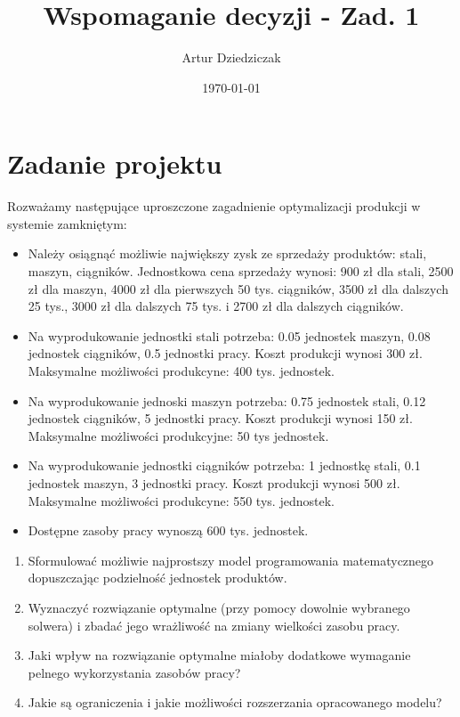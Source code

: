 \documentclass{article}
\title{Wspomaganie decyzji - Zad. 1}
\author{Artur Dziedziczak}
\date{\today}
\begin{document}
\maketitle

\section{Zadanie projektu}

Rozważamy następujące uproszczone zagadnienie optymalizacji produkcji w systemie zamkniętym:
\begin{itemize}
    \item Należy osiągnąć możliwie największy zysk ze sprzedaży produktów: stali, maszyn, ciągników.
          Jednostkowa cena sprzedaży wynosi: 900 zł dla stali, 2500 zł dla maszyn, 4000 zł dla pierwszych 50 tys. ciągników, 3500 zł dla dalszych 25 tys.,
          3000 zł dla dalszych 75 tys. i 2700 zł dla dalszych ciągników.
    \item Na wyprodukowanie jednostki stali potrzeba: 0.05 jednostek maszyn, 0.08 jednostek ciągników, 0.5 jednostki pracy.
          Koszt produkcji wynosi 300 zł. Maksymalne możliwości produkcyne: 400 tys. jednostek.
    \item  Na wyprodukowanie jednoski maszyn potrzeba: 0.75 jednostek stali, 0.12 jednostek ciągników, 5 jednostki pracy. Koszt produkcji wynosi 150 zł. Maksymalne możliwości produkcyjne: 50 tys jednostek.
    \item Na wyprodukowanie jednostki ciągników potrzeba: 1 jednostkę stali, 0.1 jednostek maszyn, 3 jednostki pracy. Koszt produkcji wynosi 500 zł. Maksymalne możliwości produkcyne: 550 tys. jednostek.
    \item Dostępne zasoby pracy wynoszą 600 tys. jednostek.
\end{itemize}
\begin{enumerate}
    \item Sformulować możliwie najprostszy model programowania matematycznego dopuszczając podzielność jednostek produktów.
    \item Wyznaczyć rozwiązanie optymalne (przy pomocy dowolnie wybranego solwera) i zbadać jego wrażliwość na zmiany wielkości zasobu pracy.
    \item Jaki wpływ na rozwiązanie optymalne miałoby dodatkowe wymaganie pelnego wykorzystania zasobów pracy?
    \item Jakie są ograniczenia i jakie możliwości rozszerzania opracowanego modelu?
\end{enumerate}
\end{document}
